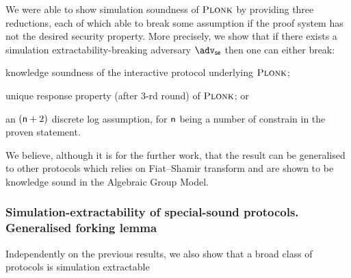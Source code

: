\documentclass[runningheads,11pt]{llncs}
\begin{document}
	We were able to show simulation soundness of $\textsc{Plonk}$ by providing three reductions, each of which able to break some assumption if the proof system has not the desired security property. 
	More precisely, we show that if there exists a simulation extractability-breaking adversary $\advse$ then one can either break: 
	\begin{compactenum}
		\item \label{it:ks} knowledge soundness of the interactive protocol underlying $\textsc{Plonk}$; 
		\item \label{it:dlog} unique response property (after $3$-rd round) of $\textsc{Plonk}$; or 
		\item \label{it:ur} an $(\mathsf{n} + 2)$ discrete log assumption, for $\mathsf{n}$ being a number of constrain in the proven statement.
	\end{compactenum}
	
	We believe, although it is for the further work, that the result can be generalised to other protocols which relies on Fiat--Shamir transform and are shown to be knowledge sound in the Algebraic Group Model.
	
	\subsubsection*{Simulation-extractability of special-sound protocols. Generalised forking lemma}
	Independently on the previous results, we also show that a broad class of protocols is simulation extractable
	
	
	
\end{document}
